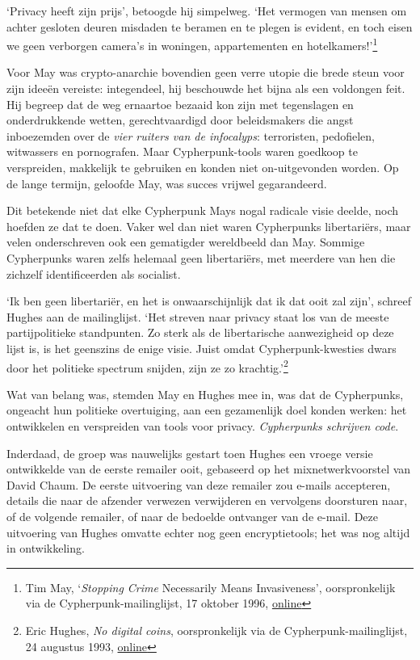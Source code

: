 \documentclass[
  a5paper,
  smalldemyvopaper,11pt,twoside,onecolumn,openright,extrafontsizes,
hidelinks]{memoir}
\begin{document}
`Privacy heeft zijn prijs', betoogde hij simpelweg. `Het vermogen van
mensen om achter gesloten deuren misdaden te beramen en te plegen is
evident, en toch eisen we geen verborgen camera's in woningen,
appartementen en hotelkamers!'\footnote{Tim May, `\emph{Stopping Crime}
  Necessarily Means Invasiveness', oorspronkelijk via de
  Cypherpunk-mailinglijst, 17 oktober 1996,
  \href{https://cypherpunks.venona.com/date/1996/10/msg01269.html}{online}}

Voor May was crypto-anarchie bovendien geen verre utopie die brede steun
voor zijn ideeën vereiste: integendeel, hij beschouwde het bijna als een
voldongen feit. Hij begreep dat de weg ernaartoe bezaaid kon zijn met
tegenslagen en onderdrukkende wetten, gerechtvaardigd door beleidsmakers
die angst inboezemden over de \emph{vier ruiters van de infocalyps}:
terroristen, pedofielen, witwassers en pornografen. Maar
Cypherpunk-tools waren goedkoop te verspreiden, makkelijk te gebruiken
en konden niet on-uitgevonden worden. Op de lange termijn, geloofde May,
was succes vrijwel gegarandeerd.

Dit betekende niet dat elke Cypherpunk Mays nogal radicale visie deelde,
noch hoefden ze dat te doen. Vaker wel dan niet waren Cypherpunks
libertariërs, maar velen onderschreven ook een gematigder wereldbeeld
dan May. Sommige Cypherpunks waren zelfs helemaal geen libertariërs, met
meerdere van hen die zichzelf identificeerden als socialist.

`Ik ben geen libertariër, en het is onwaarschijnlijk dat ik dat ooit zal
zijn', schreef Hughes aan de mailinglijst. `Het streven naar privacy
staat los van de meeste partijpolitieke standpunten. Zo sterk als de
libertarische aanwezigheid op deze lijst is, is het geenszins de enige
visie. Juist omdat Cypherpunk-kwesties dwars door het politieke spectrum
snijden, zijn ze zo krachtig.'\footnote{Eric Hughes, \emph{No digital
  coins}, oorspronkelijk via de Cypherpunk-mailinglijst, 24 augustus
  1993,
  \href{https://cypherpunks.venona.com/date/1993/08/msg00690.html}{online}}

Wat van belang was, stemden May en Hughes mee in, was dat de
Cypherpunks, ongeacht hun politieke overtuiging, aan een gezamenlijk
doel konden werken: het ontwikkelen en verspreiden van tools voor
privacy. \emph{Cypherpunks schrijven code}.

Inderdaad, de groep was nauwelijks gestart toen Hughes een vroege versie
ontwikkelde van de eerste remailer ooit, gebaseerd op het
mixnetwerkvoorstel van David Chaum. De eerste uitvoering van deze
remailer zou e-mails accepteren, details die naar de afzender verwezen
verwijderen en vervolgens doorsturen naar, of de volgende remailer, of
naar de bedoelde ontvanger van de e-mail. Deze uitvoering van Hughes
omvatte echter nog geen encryptietools; het was nog altijd in
ontwikkeling.
\end{document}
